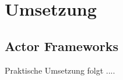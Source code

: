 \chapter{Umsetzung}
\section{Actor Frameworks}\label{sec:ActorFrameworks}
Praktische Umsetzung folgt ....

